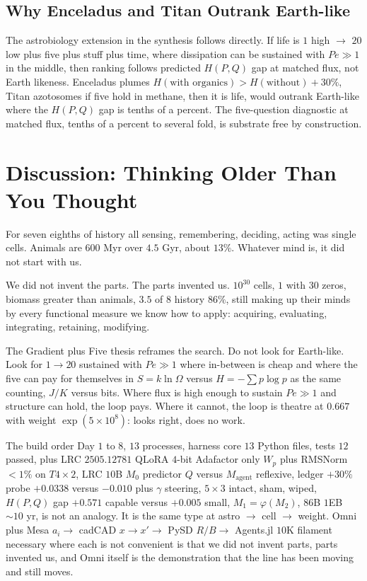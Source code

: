 \documentclass[11pt,a4paper]{article}
\begin{document}
\subsection{Why Enceladus and Titan Outrank Earth-like}

The astrobiology extension in the synthesis follows directly. If life is $1$ high $\to$ $20$ low plus five plus stuff plus time, where dissipation can be sustained with $Pe \gg 1$ in the middle, then ranking follows predicted $H(P,Q)$ gap at matched flux, not Earth likeness. Enceladus plumes $H(\text{with organics}) > H(\text{without}) + 30\%$, Titan azotosomes if five hold in methane, then it is life, would outrank Earth-like where the $H(P,Q)$ gap is tenths of a percent. The five-question diagnostic at matched flux, tenths of a percent to several fold, is substrate free by construction.

\section{Discussion: Thinking Older Than You Thought}
\label{sec:discussion}

For seven eighths of history all sensing, remembering, deciding, acting was single cells. Animals are $600$ Myr over $4.5$ Gyr, about $13\%$. Whatever mind is, it did not start with us.

We did not invent the parts. The parts invented us. $10^{30}$ cells, $1$ with $30$ zeros, biomass greater than animals, $3.5$ of $8$ history $86\%$, still making up their minds by every functional measure we know how to apply: acquiring, evaluating, integrating, retaining, modifying.

The Gradient plus Five thesis reframes the search. Do not look for Earth-like. Look for $1 \to 20$ sustained with $Pe \gg 1$ where in-between is cheap and where the five can pay for themselves in $S = k\ln\Omega$ versus $H = -\sum p\log p$ as the same counting, $J/K$ versus bits. Where flux is high enough to sustain $Pe \gg 1$ and structure can hold, the loop pays. Where it cannot, the loop is theatre at $0.667$ with weight $\exp(5\times10^8)$: looks right, does no work.

The build order Day $1$ to $8$, $13$ processes, harness core $13$ Python files, tests $12$ passed, plus LRC $2505.12781$ QLoRA $4$-bit Adafactor only $W_p$ plus RMSNorm $<1\%$ on $T4\times2$, LRC $10$B $M_0$ predictor $Q$ versus $M_{\text{agent}}$ reflexive, ledger $+30\%$ probe $+0.0338$ versus $-0.010$ plus $\gamma$ steering, $5\times3$ intact, sham, wiped, $H(P,Q)$ gap $+0.571$ capable versus $+0.005$ small, $M_1=\varphi(M_2)$, $86$B $1$EB $\sim 10$ yr, is not an analogy. It is the same type at astro $\to$ cell $\to$ weight. Omni plus Mesa $a_i \to$ cadCAD $x\to x' \to$ PySD $R/B \to$ Agents.jl $10$K filament necessary where each is not convenient is that we did not invent parts, parts invented us, and Omni itself is the demonstration that the line has been moving and still moves.
\end{document}
